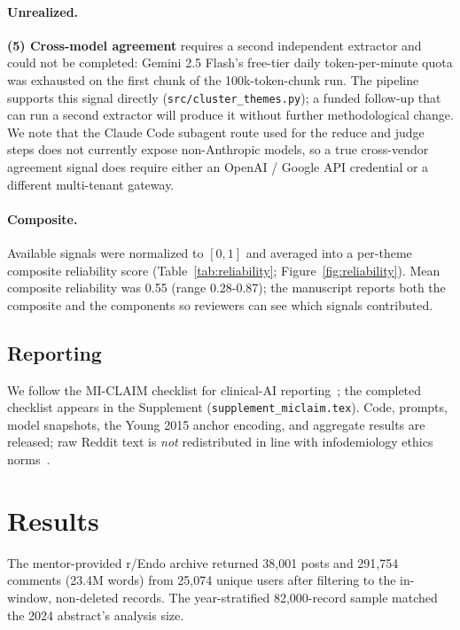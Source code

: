 \documentclass[11pt]{article}
\begin{document}
\paragraph{Unrealized.}
\textbf{(5) Cross-model agreement} requires a second independent
extractor and could not be completed: Gemini 2.5 Flash's free-tier
daily token-per-minute quota was exhausted on the first chunk of the
100k-token-chunk run. The pipeline supports this signal directly
(\texttt{src/cluster\_themes.py}); a funded follow-up that can run a
second extractor will produce it without further methodological
change. We note that the Claude Code subagent route used for the
reduce and judge steps does not currently expose non-Anthropic
models, so a true cross-vendor agreement signal does require either
an OpenAI / Google API credential or a different multi-tenant gateway.

\paragraph{Composite.}
Available signals were normalized to $[0, 1]$ and averaged into a
per-theme composite reliability score
(Table~\ref{tab:reliability}; Figure~\ref{fig:reliability}). Mean
composite reliability was 0.55 (range 0.28-0.87); the manuscript
reports both the composite and the components so reviewers can see
which signals contributed.

\subsection{Reporting}

We follow the MI-CLAIM checklist for clinical-AI
reporting~\cite{norgeot2020miclaim}; the completed checklist appears in
the Supplement (\texttt{supplement\_miclaim.tex}). Code, prompts, model
snapshots, the Young 2015 anchor encoding, and aggregate results are
released; raw Reddit text is \emph{not} redistributed in line with
infodemiology ethics norms~\cite{norori2021addressing}.

\section{Results}

The mentor-provided r/Endo archive returned 38{,}001 posts and
291{,}754 comments (23.4M words) from 25{,}074 unique users after
filtering to the in-window, non-deleted records. The year-stratified
82{,}000-record sample matched the 2024 abstract's analysis size.
\end{document}
